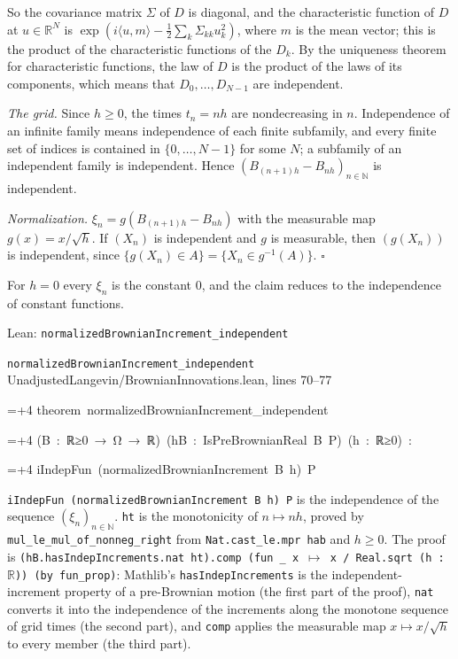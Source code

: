 \documentclass[11pt,a4paper]{article}
\newlength{\leancharwidth}
\newenvironment{leancode}{\par\smallskip\begingroup\ttfamily\footnotesize\raggedright
  \settowidth{\leancharwidth}{M}\setlength{\parskip}{0pt}\setlength{\parindent}{0pt}
  \frenchspacing}{\par\endgroup\smallskip}
\newcommand{\leanline}[2]{\hangindent=\dimexpr#1\leancharwidth+4\leancharwidth\relax
  \hangafter=1\noindent\hspace*{#1\leancharwidth}#2\par}
\newcommand{\leansource}[1]{\par{\footnotesize\color{leanmuted}#1}\par}
\newcommand{\leanlabel}[1]{\par\smallskip\noindent{\small\bfseries #1}\par}
\begin{document}
So the covariance matrix \(\Sigma\) of \(D\) is diagonal, and the characteristic function of \(D\) at \(u\in\mathbb R^N\) is \(\exp(i\langle u,m\rangle-\frac12\sum_k\Sigma_{kk}u_k^2)\), where \(m\) is the mean vector; this is the product of the characteristic functions of the \(D_k\). By the uniqueness theorem for characteristic functions, the law of \(D\) is the product of the laws of its components, which means that \(D_0,\dots,D_{N-1}\) are independent.




\emph{The grid.} Since \(h\ge0\), the times \(t_n=nh\) are nondecreasing in \(n\). Independence of an infinite family means independence of each finite subfamily, and every finite set of indices is contained in \(\{0,\dots,N-1\}\) for some \(N\); a subfamily of an independent family is independent. Hence \((B_{(n+1)h}-B_{nh})_{n\in\mathbb N}\) is independent.




\emph{Normalization.} \(\xi_n=g(B_{(n+1)h}-B_{nh})\) with the measurable map \(g(x)=x/\sqrt h\). If \((X_n)\) is independent and \(g\) is measurable, then \((g(X_n))\) is independent, since \(\{g(X_n)\in A\}=\{X_n\in g^{-1}(A)\}\). \(\square\)




For \(h=0\) every \(\xi_n\) is the constant \(0\), and the claim reduces to the independence of constant functions.

\begin{leanbox}{Lean: \texttt{normalizedBrownianIncrement\_\allowbreak{}independent}}
\leansource{\texttt{normalizedBrownianIncrement\_\allowbreak{}independent} \quad UnadjustedLangevin/\allowbreak{}BrownianInnovations.lean, lines 70–77}
\begin{leancode}
\leanline{0}{theorem\ normalizedBrownianIncrement\_independent}
\leanline{4}{(B\ :\ ℝ≥0\ →\ Ω\ →\ ℝ)\ (hB\ :\ IsPreBrownianReal\ B\ P)\ (h\ :\ ℝ≥0)\ :}
\leanline{4}{iIndepFun\ (normalizedBrownianIncrement\ B\ h)\ P}
\end{leancode}
\leanlabel{How the Lean proof follows the argument}
\texttt{i\allowbreak{}Indep\allowbreak{}Fun (normalized\allowbreak{}Brownian\allowbreak{}Increment B h) P} is the independence of the sequence \((\xi_n)_{n\in\mathbb N}\). \texttt{ht} is the monotonicity of \(n\mapsto nh\), proved by \texttt{mul\_\allowbreak{}le\_\allowbreak{}mul\_\allowbreak{}of\_\allowbreak{}nonneg\_\allowbreak{}right} from \texttt{Nat.\allowbreak{}cast\_\allowbreak{}le.\allowbreak{}mpr hab} and \(h\ge0\). The proof is \texttt{(h\allowbreak{}B.\allowbreak{}has\allowbreak{}Indep\allowbreak{}Increments.\allowbreak{}nat ht).\allowbreak{}comp (fun \_\allowbreak{} x \ensuremath{\mapsto} x /\allowbreak{} Real.\allowbreak{}sqrt (h : \ensuremath{\mathbb R})) (by fun\_\allowbreak{}prop)}: Mathlib's \texttt{has\allowbreak{}Indep\allowbreak{}Increments} is the independent-increment property of a pre-Brownian motion (the first part of the proof), \texttt{nat} converts it into the independence of the increments along the monotone sequence of grid times (the second part), and \texttt{comp} applies the measurable map \(x\mapsto x/\sqrt h\) to every member (the third part).
\end{leanbox}
\end{document}
